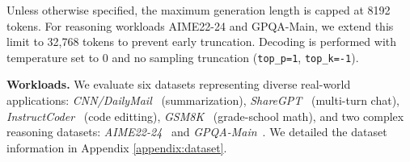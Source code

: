 Unless otherwise specified, the maximum generation length is capped at 8192 tokens.
For reasoning workloads AIME22-24 and GPQA-Main, we extend this limit to 32,768 tokens to prevent early truncation.
Decoding is performed with temperature set to 0 and no sampling truncation (\texttt{top\_p=1}, \texttt{top\_k=-1}).

\textbf{Workloads.}
We evaluate six datasets representing diverse real-world applications:
\textit{CNN/DailyMail}~\cite{hermann2015teaching, see-etal-2017-get} (summarization),
\textit{ShareGPT}~\cite{sharegpt} (multi-turn chat),
\textit{InstructCoder}~\cite{li2024instructcoder} (code editting),
\textit{GSM8K}~\cite{cobbe2021gsm8k} (grade-school math),
and two complex reasoning datasets: \textit{AIME22-24}~\cite{AIME-AoPS, AIME-HF} and \textit{GPQA-Main}~\cite{rein2023gpqagraduatelevelgoogleproofqa}. We detailed the dataset information in Appendix \autoref{appendix:dataset}. 






